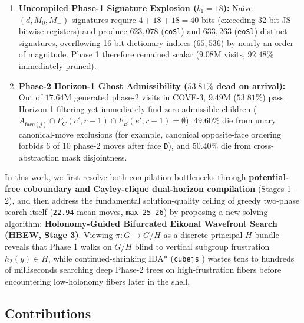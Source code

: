 \documentclass[10pt,twocolumn,letterpaper]{article}
\providecommand{\tightlist}{\setlength{\itemsep}{0pt}\setlength{\parskip}{0pt}}
\begin{document}
\begin{enumerate}
\def\labelenumi{\arabic{enumi}.}
\tightlist
\item
  \textbf{Uncompiled Phase-1 Signature Explosion (\(b_1 = 18\)):} Naive
  \((d, M_0, M_-)\) signatures require \(4 + 18 + 18 = 40\) bits
  (exceeding 32-bit JS bitwise registers) and produce \(623,078\)
  (\texttt{coSl}) and \(633,263\) (\texttt{eoSl}) distinct signatures,
  overflowing 16-bit dictionary indices (\(65,536\)) by nearly an order
  of magnitude. Phase 1 therefore remained scalar (\(9.08\)M visits,
  \(92.48\%\) immediately pruned).
\item
  \textbf{Phase-2 Horizon-1 Ghost Admissibility (\(53.81\%\) dead on
  arrival):} Out of \(17.64\)M generated phase-2 visits in COVE-3,
  \(9.49\)M (\(53.81\%\)) pass Horizon-1 filtering yet immediately find
  zero admissible children
  (\(A_{\text{face}(j)} \cap F_C(c', r-1) \cap F_E(e', r-1) = \emptyset\)):
  \(49.60\%\) die from unary canonical-move exclusions (for example,
  canonical opposite-face ordering forbids 6 of 10 phase-2 moves after
  face \texttt{D}), and \(50.40\%\) die from cross-abstraction mask
  disjointness.
\end{enumerate}

In this work, we first resolve both compilation bottlenecks through
\textbf{potential-free coboundary and Cayley-clique dual-horizon
compilation} (Stages 1--2), and then address the fundamental
solution-quality ceiling of greedy two-phase search itself
(\texttt{22.94} mean moves, \texttt{max\ 25–26}) by proposing a new
solving algorithm: \textbf{Holonomy-Guided Bifurcated Eikonal Wavefront
Search (HBEW, Stage 3)}. Viewing \(\pi: G \to G/H\) as a discrete
principal \(H\)-bundle reveals that Phase 1 walks on \(G/H\) blind to
vertical subgroup frustration \(h_2(y) \in H\), while
continued-shrinking IDA* (\texttt{cubejs} \cite{cubejs}) wastes tens to
hundreds of milliseconds searching deep Phase-2 trees on
high-frustration fibers before encountering low-holonomy fibers later in
the shell.

\hypertarget{contributions}{%
\subsection{Contributions}\label{contributions}}
\end{document}
